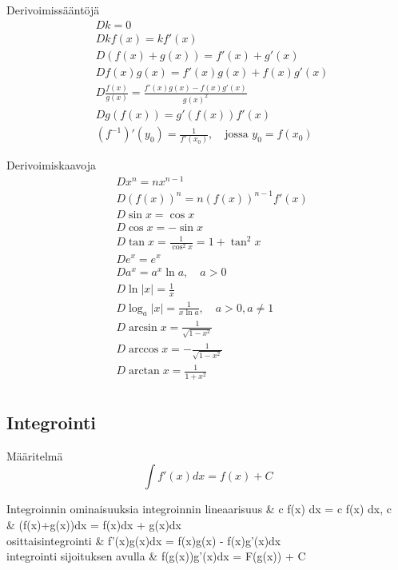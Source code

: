 Derivoimissääntöjä \cite[s. 41]{MAOL}
\begin{align*}
& Dk					= 0 \\
& Dkf(x)				= kf'(x) \\
& D(f(x) + g(x))		= f'(x) + g'(x) \\
& Df(x)g(x)			= f'(x)g(x)+f(x)g'(x) \\
& D \frac{f(x)}{g(x)}	= \frac{f'(x)g(x)-f(x)g'(x)}{g(x)^2} \\
& D g(f(x))			= g'(f(x))f'(x) \\
& (f^{-1})'(y_0)		= \frac{1}{f'(x_0)}, \quad \text{jossa } y_0 = f(x_0)
\end{align*}

Derivoimiskaavoja \cite[s. 41]{MAOL}
\begin{align*}
& Dx^n	= nx^{n-1} \\
& D(f(x))^n	= n(f(x))^{n-1} f'(x) \\
& D \sin x	= \cos x \\
& D \cos x	= -\sin x \\
& D \tan x	= \frac{1}{\cos^2 x} = 1 + \tan^2 x \\
& D e^x		= e^x \\
& D a^x		= a^x \ln a, \quad a>0 \\
& D \ln |x|	= \frac{1}{x} \\
& D \log_a |x|	= \frac{1}{x \ln a}, \quad a>0, a \neq 1 \\
& D \arcsin x	= \frac{1}{\sqrt{1-x^2}} \\
& D \arccos x	= - \frac{1}{\sqrt{1-x^2}} \\
& D \arctan x	= \frac{1}{1+x^2} \\
\end{align*}

\subsection{Integrointi}
Määritelmä \cite[(1.8)]{MAT-01360}
\begin{equation*}
\int f'(x) dx = f(x) + C
\end{equation*}

\begin{eqtable-full}{Integroinnin ominaisuuksia \cite{MAT-01360} }
integroinnin lineaarisuus 		& \int c f(x) dx = c \int f(x) dx, \quad c \in {} \\ %
														& \int (f(x)+g(x))dx = \int f(x)dx + \int g(x)dx \\
osittaisintegrointi 			& \int f'(x)g(x)dx = f(x)g(x) - \int f(x)g'(x)dx \\ %
integrointi sijoituksen avulla 	& \int f(g(x))g'(x)dx = F(g(x)) + C \\ %
\end{eqtable-full}

